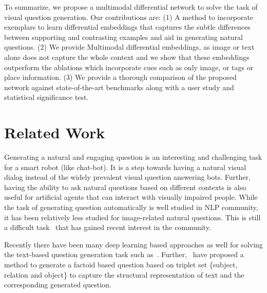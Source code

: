 \documentclass[11pt,a4paper]{article}
\begin{document}
To summarize, we propose a multimodal differential network to solve the task of visual question generation. Our contributions are: (1) A method to incorporate exemplars to learn differential embeddings that captures the subtle differences between supporting and contrasting examples and aid in generating natural questions. (2) We provide Multimodal differential embeddings, as image or text alone does not capture the whole context and we show that these embeddings outperform the ablations which incorporate cues such as only image, or tags or place information. (3) We provide a thorough comparison of the proposed network against state-of-the-art benchmarks along with a user study and statistical significance test.



 
\section{Related Work}






\label{sec:lit_surv}
Generating a natural and engaging question is an interesting and challenging task for a smart robot (like chat-bot). It is a step towards having a natural visual dialog instead of the widely prevalent visual question answering bots. Further, having the ability to ask natural questions based on different contexts is also useful for artificial agents that can interact with visually impaired people. While the task of generating question automatically is well studied in NLP community, it has been relatively less studied for image-related natural questions. This is still a difficult task~\cite{mostafazadeh2016generating} that has gained recent interest in the community.
    
Recently there have been many deep learning based approaches as well for solving the text-based question generation task such as~\cite{Du_ArXiv2017}.
Further,~\cite{Serban_Arxiv2016} have proposed a method to generate a factoid based question based on triplet set \{subject, relation and object\} to capture the structural representation of text and the corresponding generated question.
\end{document}
